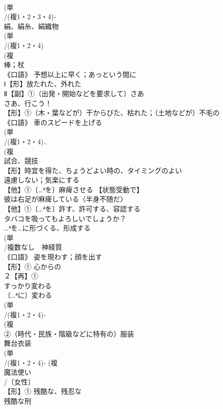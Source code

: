 \documentclass[8pt]{extreport}
\begin{document}
\begin{CJK}{UTF8}{min}
\\	(単
\\	/(複1・2・3・4)‐
\\	絹、絹糸、絹織物 
\\	(単
\\	/(複1・2・4)
\\	(複
\\	棒；杖
\\	｟口語｠ 予想以上に早く；あっという間に
\\	Ⅰ【形】放たれた、外れた 
\\	Ⅱ【副】①（出発・開始などを要求して）さあ　
\\	さあ、行こう！
\\	【形】①（木・葉などが）干からびた、枯れた；（土地などが）不毛の 
\\	｟口語｠ 車のスピードを上げる
\\	(単
\\	/(複1・2・4)..
\\	(複
\\	試合、競技 
\\	【形】時宜を得た、ちょうどよい時の、タイミングのよい
\\	遠慮しない；気楽にする
\\	【他】①〔…⁴を〕麻痺させる 【状態受動で】
\\	彼は右足が麻痺している〈半身不随だ〉
\\	【他】①〔…⁴を〕許す、許可する、容認する 
\\	タバコを吸ってもよろしいでしょうか？ 
\\	…⁴を…に形づくる、形成する
\\	(単
\\	/複数なし　神経質 
\\	｟口語｠ 姿を現わす；顔を出す
\\	【形】① 心からの
\\	２【再】①
\\	すっかり変わる 
\\	〔…⁴に〕変わる
\\	(単
\\	/(複1・2・4)-
\\	(複
\\	②（時代・民族・階級などに特有の）服装　
\\	舞台衣装
\\	(単
\\	/(複1・2・4)- (複
\\	魔法使い 
\\	/〔女性〕
\\	【形】① 残酷な、残忍な 
\\	残酷な刑 

\end{CJK}
\end{document}
